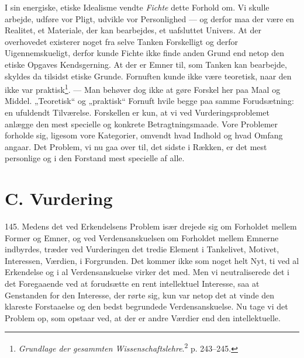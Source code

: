 \documentclass[12pt,a4paper]{book}
\newcommand{\opage}[1]{\marginnote{\footnotesize\textit{[#1]}}}
\begin{document}
I sin energiske, etiske Idealisme vendte \emph{Fichte} dette Forhold om. Vi skulle arbejde,
udføre vor Pligt, udvikle vor Personlighed --- og derfor maa der være en Realitet, et
Materiale, der kan bearbejdes, et uafsluttet Univers. At der overhovedet existerer noget fra selve Tanken Forskelligt og derfor Uigennemskueligt, derfor kunde Fichte ikke finde
anden Grund end netop den etiske Opgaves Kendsgerning. At der er Emner til, som Tanken kan
bearbejde, skyldes da tilsidst etiske Grunde. Fornuften kunde ikke være teoretisk, naar den
ikke var praktisk\footnote{\emph{Grundlage der gesammten Wissenschaftslehre}.\textsuperscript{2}
p. 243--245.}. --- Man behøver dog ikke at gøre Forskel her paa Maal og Middel. „Teoretisk“
og „praktisk“ Fornuft hvile begge paa samme Forudsætning: en ufuldendt Tilværelse.
Forskellen er kun, at vi ved Vurderingsproblemet anlægge den mest specielle og konkrete
Betragtningsmaade. Vore Problemer forholde sig, ligesom vore Kategorier, omvendt hvad
Indhold og hvad Omfang angaar. Det Problem, vi nu gaa over til, det sidste i Rækken, er det
mest personlige og i den Forstand mest specielle af alle.

\opage{346} \section*{C. Vurdering}
\label{sec:vurdering}

 145. Medens det ved Erkendelsens Problem især drejede sig om Forholdet mellem Former og
Emner, og ved Verdensanskuelsen om Forholdet mellem Emnerne indbyrdes, træder ved
Vurderingen det tredie Element i Tankelivet, Motivet, Interessen, Værdien, i Forgrunden.
Det kommer ikke som noget helt Nyt, ti ved al Erkendelse og i al Verdensanskuelse virker det
med. Men vi neutraliserede det i det Foregaaende ved at forudsætte en rent intellektuel
Interesse, saa at Genstanden for den Interesse, der rørte sig, kun var netop det at vinde
den klareste Forstaaelse og den bedst begrundede Verdensanskuelse. Nu tage vi det Problem
op, som opstaar ved, at der er andre Værdier end den intellektuelle.
\end{document}
